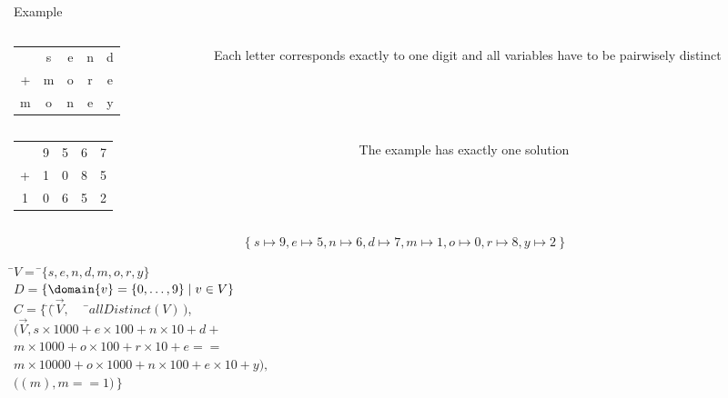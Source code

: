 \begin{frame}{Example}
  \begin{columns}
    \begin{column}{.35\textwidth}
      \begin{tabular}[t]{ccccc}
         &s&e&n&d\\
        +&m&o&r&e\\
        \hline
        m&o&n&e&y
      \end{tabular}
    \end{column}
    \begin{column}{.35\textwidth}
      Each letter corresponds exactly to one digit and all variables have to be
      pairwisely distinct
    \end{column}
  \end{columns}
\pause
\bigskip\bigskip
{}
{%

  \begin{columns}
    \begin{column}{.35\textwidth}
      \begin{tabular}[t]{ccccc}
         &9&5&6&7\\
        +&1&0&8&5\\
        \hline
        1&0&6&5&2
      \end{tabular}
    \end{column}
    \begin{column}{.35\textwidth}
      The example has exactly one solution
    \end{column}
  \end{columns}
\[
\{\ s\mapsto9, e\mapsto5, n\mapsto6, d\mapsto7, m\mapsto1, o\mapsto0, r\mapsto8, y\mapsto2\ \}
\]
}{%
\begin{tabbing}
 \qquad
 \=$V =\;$\=$\{s,e,n,d,m,o,r,y\}$\\[5pt]
 \>$D =$\>$\{\domain{v}= \{0,\dots,9\}\mid v \in V\}$\\[5pt]
 \>$C =$\>$\{\,$\=$(\,$\=$\vec{V},$~~~\=$allDistinct(V)\,)$,\\
 \>\>\>$($\>$\vec{V},$\>$s\times1000+e\times100+n\times10+d +$\\
 \>\>\>\>\>$m\times1000+o\times100+r\times10+e ==$\\
 \>\>\>\>\>$m\times10000+o\times1000+n\times100+e\times10+y),$\\
 \>\>\>$($\>$(m),$\>$ m == 1)\,\}$\\
\end{tabbing}}
\end{frame}
